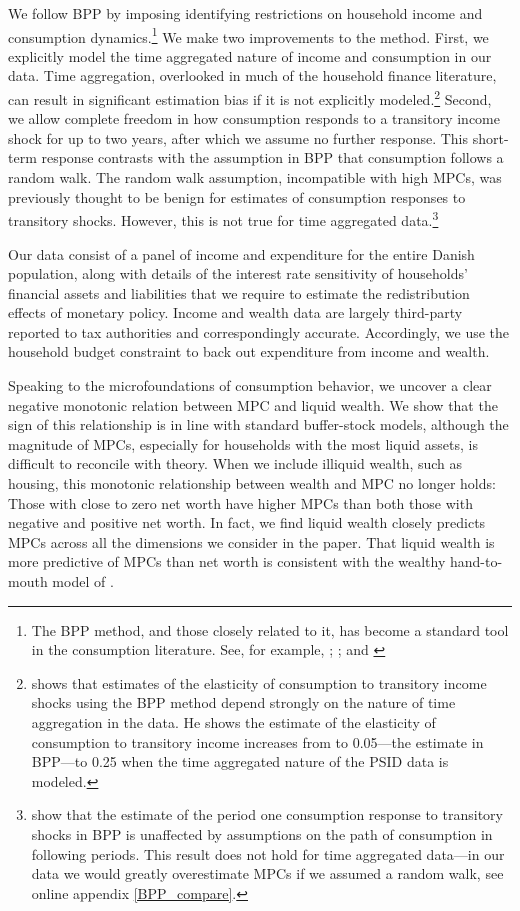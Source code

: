 \documentclass[titlepage]{\econtex}\newcommand{\texname}{ConsumptionHeterogeneity}
\begin{document}
	We follow BPP by imposing identifying restrictions on household income and consumption dynamics.\footnote{The BPP method, and those closely related to it, has become a standard tool in the consumption literature. See, for example, \cite{violante_wealthy_2014}; \cite{auclert_monetary_2017}; and \cite{manovskii_how_2017}} We make two improvements to the method. First, we explicitly model the time aggregated nature of income and consumption in our data. Time aggregation, overlooked in much of the household finance literature, can result in significant estimation bias if it is not explicitly modeled.\footnote{\cite{crawley_time_2020} shows that estimates of the elasticity of consumption to transitory income shocks using the BPP method depend strongly on the nature of time aggregation in the data. He shows the estimate of the elasticity of consumption to transitory income increases from to 0.05---the estimate in BPP---to 0.25 when the time aggregated nature of the PSID data is modeled.} Second, we allow complete freedom in how consumption responds to a transitory income shock for up to two years, after which we assume no further response. This short-term response contrasts with the assumption in BPP that consumption follows a random walk. The random walk assumption, incompatible with high MPCs, was previously thought to be benign for estimates of consumption responses to transitory shocks. However, this is not true for time aggregated data.\footnote{\cite{kaplan_how_2010} show that the estimate of the period one consumption response to transitory shocks in BPP is unaffected by assumptions on the path of consumption in following periods. This result does not hold for time aggregated data---in our data we would greatly overestimate MPCs if we assumed a random walk, see online appendix \ref{BPP_compare}.} 
	
	Our data consist of a panel of income and expenditure for the entire Danish population, along with details of the interest rate sensitivity of households' financial assets and liabilities that we require to estimate the redistribution effects of monetary policy. Income and wealth data are largely third-party reported to tax authorities and correspondingly accurate. Accordingly, we use the household budget constraint to back out expenditure from income and wealth.
	
	Speaking to the microfoundations of consumption behavior, we uncover a clear negative monotonic relation between MPC and liquid wealth. We show that the sign of this relationship is in line with standard buffer-stock models, although the magnitude of MPCs, especially for households with the most liquid assets, is difficult to reconcile with theory. When we include illiquid wealth, such as housing, this monotonic relationship between wealth and MPC no longer holds: Those with close to zero net worth have higher MPCs than both those with negative and positive net worth. In fact, we find liquid wealth closely predicts MPCs across all the dimensions we consider in the paper. That liquid wealth is more predictive of MPCs than net worth is consistent with the wealthy hand-to-mouth model of \cite{violante_wealthy_2014}.
	
\end{document}
